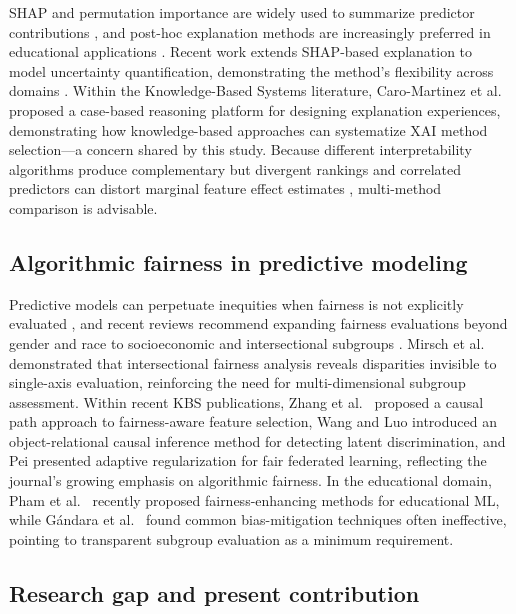 \documentclass[review,12pt]{elsarticle}
\begin{document}
SHAP and permutation importance are widely used to summarize predictor contributions \citep{Lundberg_Lee_2017,Molnar_2022}, and post-hoc explanation methods are increasingly preferred in educational applications \citep{Khosravi_2022}. Recent work extends SHAP-based explanation to model uncertainty quantification, demonstrating the method's flexibility across domains \citep{Cheng_2026_uncertainty_SHAP}. Within the Knowledge-Based Systems literature, Caro-Martinez et al.\ \citep{CaroMartinez2024iSee} proposed a case-based reasoning platform for designing explanation experiences, demonstrating how knowledge-based approaches can systematize XAI method selection---a concern shared by this study. Because different interpretability algorithms produce complementary but divergent rankings \citep{Niu_2025} and correlated predictors can distort marginal feature effect estimates \citep{Herbinger_2024_GADGET}, multi-method comparison is advisable.

\subsection{Algorithmic fairness in predictive modeling}

Predictive models can perpetuate inequities when fairness is not explicitly evaluated \citep{Baker_Hawn_2022,Kizilcec_Lee_2022}, and recent reviews recommend expanding fairness evaluations beyond gender and race to socioeconomic and intersectional subgroups \citep{Idowu_2024_debiasing}. Mirsch et al.\ \citep{Mirsch_2025_intersectional} demonstrated that intersectional fairness analysis reveals disparities invisible to single-axis evaluation, reinforcing the need for multi-dimensional subgroup assessment. Within recent KBS publications, Zhang et al.\ \citep{Zhang2025FairnessFeature} proposed a causal path approach to fairness-aware feature selection, Wang and Luo \citep{Wang_2024_latent_discrimination} introduced an object-relational causal inference method for detecting latent discrimination, and Pei \citep{Pei2025F3Fair} presented adaptive regularization for fair federated learning, reflecting the journal's growing emphasis on algorithmic fairness. In the educational domain, Pham et al.\ \citep{Pham_2025_FAIREDU} recently proposed fairness-enhancing methods for educational ML, while G\'andara et al.\ \citep{Gandara_2024_blackbox} found common bias-mitigation techniques often ineffective, pointing to transparent subgroup evaluation as a minimum requirement.

\subsection{Research gap and present contribution}
\end{document}
